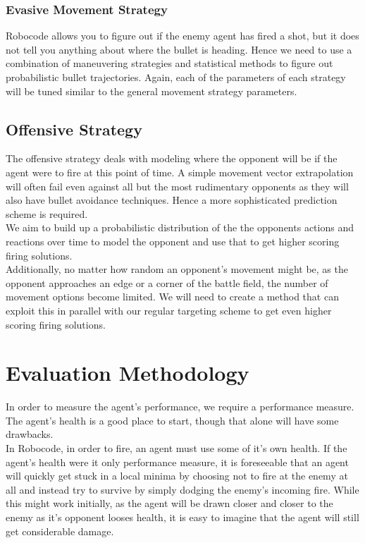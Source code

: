 \documentclass{article}
\theoremstyle{plain}
\theoremstyle{definition}
\theoremstyle{remark}
\begin{document}
\subsubsection*{Evasive Movement Strategy}
Robocode allows you to figure out if the enemy agent has fired a shot, but it does not tell you anything about where the bullet is heading. Hence we need to use a combination of maneuvering strategies and statistical methods to figure out probabilistic bullet trajectories. Again, each of the parameters of each strategy will be tuned similar to the general movement strategy parameters.

\subsection*{Offensive Strategy}
The offensive strategy deals with modeling where the opponent will be if the agent were to fire at this point of time. A simple movement vector extrapolation will often fail even against all but the most rudimentary opponents as they will also have bullet avoidance techniques. Hence a more sophisticated prediction scheme is required.\\

We aim to build up a probabilistic distribution of the the opponents actions and reactions over time to model the opponent and use that to get higher scoring firing solutions.\\

Additionally, no matter how random an opponent's movement might be, as the opponent approaches an edge or a corner of the battle field, the number of movement options become limited. We will need to create a method that can exploit this in parallel with our regular targeting scheme to get even higher scoring firing solutions.

\section*{Evaluation Methodology}
In order to measure the agent's performance, we require a performance measure. The agent's health is a good place to start, though that alone will have some drawbacks.\\

In Robocode, in order to fire, an agent must use some of it's own health. If the agent's health were it only performance measure, it is foreseeable that an agent will quickly get stuck in a local minima by choosing not to fire at the enemy at all and instead try to survive by simply dodging the enemy's incoming fire. While this might work initially, as the agent will be drawn closer and closer to the enemy as it's opponent looses health, it is easy to imagine that the agent will still get considerable damage.\\
\end{document}
